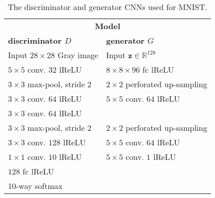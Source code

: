 \documentclass{article} \usepackage{iclr2016_conference,times}
\newcommand{\bz}{\mathbf{z}}
\begin{document}
\begin{appendix}
\begin{table}[h]
\caption{The discriminator and generator CNNs used for MNIST.}
\label{base-models}
\begin{center}
\begin{small}
\begin{tabular}{l|l}
\multicolumn{2}{c}{\textbf{Model}} \\
\bf discriminator $D$        & \bf generator $G$  \\
\hline
Input $28 \times 28$ Gray image & Input $\bz \in \mathbb{R}^{128}$ \\
\hline
$5 \times 5$ conv. $32$ lReLU & $8 \times 8 \times 96$ fc lReLU  \\
\hline
$3 \times 3$ max-pool, stride $2$ & $2 \times 2$ perforated up-sampling \\
\hline
$3 \times 3$ conv. $64$ lReLU & $5 \times 5$ conv. $64$ lReLU \\
$3 \times 3$ conv. $64$ lReLU & \\
\hline
$3 \times 3$ max-pool, stride $2$ & $2 \times 2$ perforated
                                    up-sampling \\
\hline
$3 \times 3$ conv. $128$ lReLU & $5 \times 5$ conv. $64$ lReLU \\
$1 \times 1$ conv. $10$ lReLU & $5 \times 5$ conv. $1$ lReLU \\
$128$ fc lReLU & \\ 10-way softmax & \\
\end{tabular}
\end{small}
\end{center}
\end{table}


\end{appendix}
\end{document}

